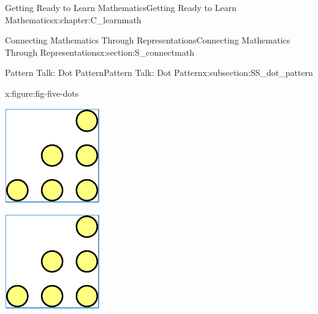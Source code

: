 \documentclass[oneside,10pt,]{book}
\numberwithin{equation}{chapter}
\begin{document}
\begin{chapterptx}{Getting Ready to Learn Mathematics}{}{Getting Ready to Learn Mathematics}{}{}{x:chapter:C_learnmath}
\begin{sectionptx}{Connecting Mathematics Through Representations}{}{Connecting Mathematics Through Representations}{}{}{x:section:S_connectmath}
\begin{subsectionptx}{Pattern Talk: Dot Pattern}{}{Pattern Talk: Dot Pattern}{}{}{x:subsection:SS_dot_pattern}
\begin{figureptx}{}{x:figure:fig-five-dots}{}
\begin{sidebyside}{5}{0.015}{0.015}{0.03}
\begin{sbspanel}{0.17}
\end{sbspanel}%
\begin{sbspanel}{0.17}%
\includegraphics[width=\linewidth]{external/tri-dots.pdf}
\end{sbspanel}%
\begin{sbspanel}{0.17}%
\includegraphics[width=\linewidth]{external/tri-dots.pdf}

\end{sbspanel}
\end{sidebyside}
\end{figureptx}
\end{subsectionptx}
\end{sectionptx}
\end{chapterptx}
\end{document}
